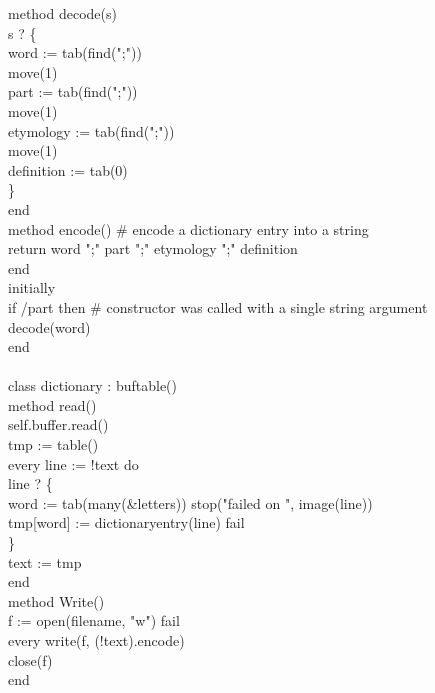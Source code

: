 {\>   method decode(s) \\
\>\>      s ? \{ \\
\>\>\>	 word := tab(find(";")) \\
\>\>\>	 move(1) \\
\>\>\>	 part := tab(find(";")) \\
\>\>\>	 move(1) \\
\>\>\>	 etymology := tab(find(";")) \\
\>\>\>	 move(1) \\
\>\>\>	 definition := tab(0) \\
\>\>\>	 \} \\
\>   end \\
\>   method encode() \# encode a dictionary entry into a string \\
\>\>      return word {\textbar}{\textbar} ";" {\textbar}{\textbar} part {\textbar}{\textbar} ";" {\textbar}{\textbar} etymology {\textbar}{\textbar} ";" {\textbar}{\textbar}
      definition \\
\>   end \\
initially \\
\>   if /part then \# constructor was called with a single string argument \\
\>\>      decode(word) \\
end \\
\ \\
class dictionary : buftable() \\
\>   method read() \\
\>\>      self.buffer.read() \\
\>\>      tmp := table() \\
\>\>      every line := !text do \\
\>\>\>	 line ? \{ \\
\>\>\>\>	    word := tab(many(\&letters)) {\textbar} stop("failed on ",
	    image(line)) \\
\>\>\>\>	    tmp[word] := dictionaryentry(line) {\textbar} fail \\
\>\>\>\>	    \} \\
\>\>      text := tmp \\
\>   end \\
\>   method Write() \\
\>\>      f := open(filename, "w") {\textbar} fail \\
\>\>      every write(f, (!text).encode) \\
\>\>      close(f) \\
\>   end \\
}
